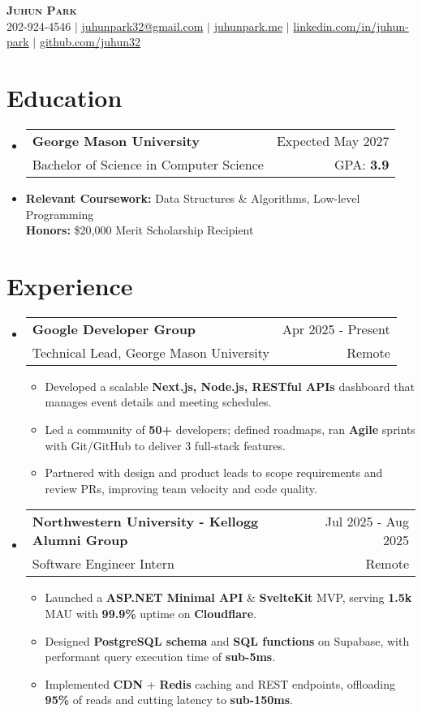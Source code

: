 \documentclass[letterpaper,11pt]{article}
\makeatletter
\newcommand{\resumeItem}[1]{
  \item{
    {#1}
  }
}
\newcommand{\resumeSubheading}[4]{
    \item
    \begin{tabular*}{0.985\textwidth}[t]{l@{\extracolsep{\fill}}r@{\hspace{-0.1in}}}
        {\textbf{#1}} & {#2} \\
        #3 &  #4 \\
    \end{tabular*}\vspace{-5pt}
}
\newcommand{\resumeSubHeadingListStart}{\begin{itemize}[leftmargin=0.00in, rightmargin=-0.2in, label={}]\vspace{3pt}}
\newcommand{\resumeSubHeadingListEnd}{\end{itemize}\vspace{-5pt}}
\newcommand{\resumeItemListStart}{\vspace{3pt}\begin{itemize}[leftmargin=0.15in, rightmargin=0.15in]}
\newcommand{\resumeItemListEnd}{\end{itemize}\vspace{-5pt}}
\makeatother
\begin{document}

\begin{center}
  \textbf{\Huge \scshape {Juhun Park}} \\ \vspace{3pt}
   202-924-4546 $|$
  \href{mailto:juhunpark32@gmail.com}{juhunpark32@gmail.com} $|$
  \href{https://www.juhunpark.me/}{juhunpark.me} $|$
  \href{https://linkedin.com/in/juhun-park}{linkedin.com/in/juhun-park} $|$
  \href{https://github.com/juhun32}{github.com/juhun32} \\
\end{center}

\vspace{-10pt}


\section{Education}
\resumeSubHeadingListStart
\resumeSubheading
{George Mason University}{Expected May 2027}
{Bachelor of Science in Computer Science}{GPA: \textbf{3.9}}
\resumeItem{\textbf{Relevant Coursework: } Data Structures \& Algorithms, Low-level Programming} \\
{\textbf{Honors: }{\$20,000 Merit Scholarship Recipient}}
\resumeSubHeadingListEnd

\vspace{-10pt}


\section{Experience}
\resumeSubHeadingListStart
\resumeSubheading
{Google Developer Group} {Apr 2025 - Present}
{Technical Lead, George Mason University} {Remote}
\resumeItemListStart
\resumeItem{Developed a scalable \textbf{Next.js, Node.js, RESTful APIs} dashboard that manages event details and meeting schedules.}
\resumeItem{Led a community of \textbf{50+} developers; defined roadmaps, ran \textbf{Agile} sprints with Git/GitHub to deliver 3 full-stack features.}
\resumeItem{Partnered with design and product leads to scope requirements and review PRs, improving team velocity and code quality.}
\resumeItemListEnd
\resumeSubHeadingListEnd

\resumeSubHeadingListStart
\resumeSubheading
{Northwestern University - Kellogg Alumni Group} {Jul 2025 - Aug 2025}
{Software Engineer Intern} {Remote}
\resumeItemListStart
\resumeItem{Launched a \textbf{ASP.NET Minimal API} \& \textbf{SvelteKit} MVP, serving \textbf{1.5k} MAU with \textbf{99.9\%} uptime on \textbf{Cloudflare}.}
\resumeItem{Designed \textbf{PostgreSQL schema} and \textbf{SQL functions} on Supabase, with performant query execution time of \textbf{sub-5ms}.}
\resumeItem{Implemented \textbf{CDN} + \textbf{Redis} caching and REST endpoints, offloading \textbf{95\%} of reads and cutting latency to \textbf{sub-150ms}.}
\resumeItemListEnd
\resumeSubHeadingListEnd
\end{document}
